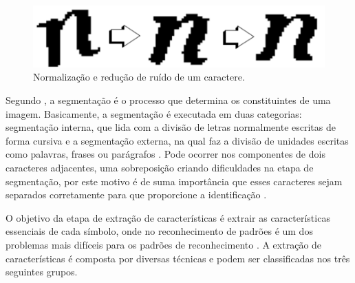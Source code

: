  \begin{figure}[h]
	\centering
	\includegraphics[width=1.0\textwidth]{Imagens/norm_suav_caracter} 
	\caption[Normalização e redução de ruído de um caractere.]{Normalização e redução de ruído de um caractere.}
	\label{fig:norm_suav_caracter}
\end{figure}

Segundo , a segmentação é o processo que determina os constituintes de uma imagem. Basicamente, a segmentação é executada em duas categorias: segmentação interna, que lida com a divisão de letras normalmente escritas de forma cursiva e a segmentação externa, na qual faz a divisão de unidades escritas como palavras, frases ou parágrafos \cite{Goswami2013}. Pode ocorrer nos componentes de dois caracteres adjacentes, uma sobreposição criando dificuldades na etapa de segmentação, por este motivo é de suma importância que esses caracteres sejam separados corretamente para que proporcione a identificação \cite{Bhatia2014}.

O objetivo da etapa de extração de características é extrair as características
essenciais de cada símbolo, onde no reconhecimento de padrões é um dos problemas mais difíceis para os padrões de reconhecimento \cite{Eikvil1993}. A extração de características é composta por diversas técnicas e podem ser classificadas nos três seguintes grupos.

